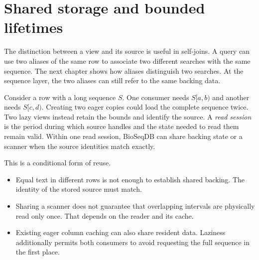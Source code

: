 \section{Shared storage and bounded lifetimes}
\label{sec:sequence-author-contract}

The distinction between a view and its source is useful in self-joins. A query
can use two aliases of the same row to associate two different searches with
the same sequence. The next chapter shows how aliases distinguish two
searches. At the sequence layer, the two aliases can still
refer to the same backing data.

Consider a row with a long sequence \(S\). One consumer needs \(S[a,b)\)
and another needs \(S[c,d)\). Creating two eager copies could load the complete
sequence twice. Two lazy views instead retain the bounds and identify the
source. A \emph{read session} is the period during which source handles and
the state needed to read them remain valid. Within one read session, BioSeqDB
can share backing state or a scanner when the source identities match exactly.

This is a conditional form of reuse.
\begin{itemize}
  \item Equal text in different rows is not enough to establish shared
        backing. The identity of the stored source must match.
  \item Sharing a scanner does not guarantee that overlapping intervals are
        physically read only once. That depends on the reader and its cache.
  \item Existing eager column caching can also share resident data. Laziness
        additionally permits both consumers to avoid requesting the full
        sequence in the first place.
\end{itemize}


